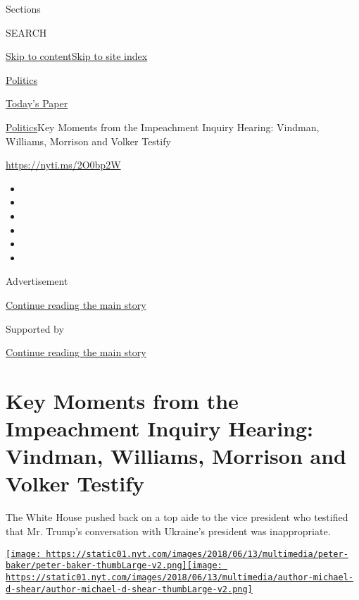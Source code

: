 Sections

SEARCH

\protect\hyperlink{site-content}{Skip to
content}\protect\hyperlink{site-index}{Skip to site index}

\href{https://www.nytimes.com/section/politics}{Politics}

\href{https://myaccount.nytimes.com/auth/login?response_type=cookie\&client_id=vi}{}

\href{https://www.nytimes.com/section/todayspaper}{Today's Paper}

\href{/section/politics}{Politics}\textbar{}Key Moments from the
Impeachment Inquiry Hearing: Vindman, Williams, Morrison and Volker
Testify

\url{https://nyti.ms/2O0bp2W}

\begin{itemize}
\item
\item
\item
\item
\item
\item
\end{itemize}

Advertisement

\protect\hyperlink{after-top}{Continue reading the main story}

Supported by

\protect\hyperlink{after-sponsor}{Continue reading the main story}

\hypertarget{key-moments-from-the-impeachment-inquiry-hearing-vindman-williams-morrison-and-volker-testify}{%
\section{Key Moments from the Impeachment Inquiry Hearing: Vindman,
Williams, Morrison and Volker
Testify}\label{key-moments-from-the-impeachment-inquiry-hearing-vindman-williams-morrison-and-volker-testify}}

The White House pushed back on a top aide to the vice president who
testified that Mr. Trump's conversation with Ukraine's president was
inappropriate.

\href{https://www.nytimes.com/by/peter-baker}{\texttt{[image: https://static01.nyt.com/images/2018/06/13/multimedia/peter-baker/peter-baker-thumbLarge-v2.png]}}\href{https://www.nytimes.com/by/michael-d-shear}{\texttt{[image: https://static01.nyt.com/images/2018/06/13/multimedia/author-michael-d-shear/author-michael-d-shear-thumbLarge-v2.png]}}

